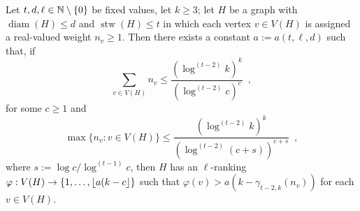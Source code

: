\documentclass[kpfonts]{patmorin}
\DeclareMathOperator{\diam}{diam}
\DeclareMathOperator{\stw}{stw}
\theoremstyle{named}
\begin{document}
\begin{lem}\label{t-tree-slack}
    Let $t,d,\ell\in\mathbb{N}\setminus\{0\}$ be fixed values, let $k\ge 3$; let $H$ be a graph with $\diam(H)\le d$ and $\stw(H)\le t$ in which each vertex $v\in V(H)$ is assigned a real-valued weight $n_v\ge 1$. Then there exists a constant $a:=a(t,\ell,d)$ such that, if
    \begin{equation}
         \sum_{v\in V(H)} n_v \le \frac{(\log^{(t-2)} k)^k}{(\log^{(t-2)} c)^{c}} \enspace ,
     \label{total-weight}
    \end{equation}
    for some $c\ge 1$ and
    \begin{equation}
         \max\{n_v:v\in V(H)\} \le \frac{(\log^{(t-2)} k)^k}{(\log^{(t-2)} (c+s))^{c+s}} \enspace ,
     \label{max-weight}
    \end{equation}
    where $s := \log c/\log^{(t-1)} c$, then $H$ has an $\ell$-ranking $\varphi:V(H)\to\{1,\ldots, {\lfloor a(k-c \rfloor}\}$ such that $\varphi(v)> a(k-\gamma_{t-2,k}(n_v))$ for each $v\in V(H)$.
\end{lem}
\end{document}
